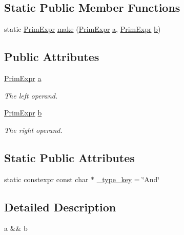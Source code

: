 \subsection*{Static Public Member Functions}
\begin{DoxyCompactItemize}
\item 
static \hyperlink{classtvm_1_1PrimExpr}{Prim\+Expr} \hyperlink{classtvm_1_1tir_1_1AndNode_aeb51390ed2566af9393d94d915e56d50}{make} (\hyperlink{classtvm_1_1PrimExpr}{Prim\+Expr} \hyperlink{classtvm_1_1tir_1_1AndNode_a4a9b2cf4384567cf6719a4766a679738}{a}, \hyperlink{classtvm_1_1PrimExpr}{Prim\+Expr} \hyperlink{classtvm_1_1tir_1_1AndNode_a9e1e2e65410c1c3ed43538f475f23d83}{b})
\end{DoxyCompactItemize}
\subsection*{Public Attributes}
\begin{DoxyCompactItemize}
\item 
\hyperlink{classtvm_1_1PrimExpr}{Prim\+Expr} \hyperlink{classtvm_1_1tir_1_1AndNode_a4a9b2cf4384567cf6719a4766a679738}{a}
\begin{DoxyCompactList}\small\item\em The left operand. \end{DoxyCompactList}\item 
\hyperlink{classtvm_1_1PrimExpr}{Prim\+Expr} \hyperlink{classtvm_1_1tir_1_1AndNode_a9e1e2e65410c1c3ed43538f475f23d83}{b}
\begin{DoxyCompactList}\small\item\em The right operand. \end{DoxyCompactList}\end{DoxyCompactItemize}
\subsection*{Static Public Attributes}
\begin{DoxyCompactItemize}
\item 
static constexpr const char $\ast$ \hyperlink{classtvm_1_1tir_1_1AndNode_a6ea58bbd932087818ed84621065d73a0}{\+\_\+type\+\_\+key} = \char`\"{}And\char`\"{}
\end{DoxyCompactItemize}


\subsection{Detailed Description}
a \&\& b 

